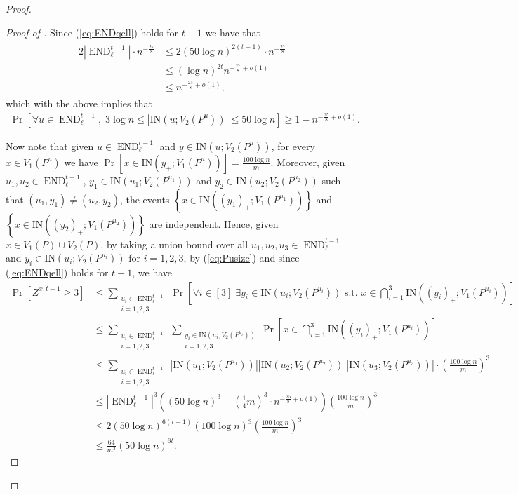 \documentclass{article}
\DeclareMathOperator{\END}{END}
\newcommand{\IN}[2]{\text{IN}\left(#1; #2 \right)}
\begin{document}
\begin{proof}
\begin{proof}[Proof of ]
		Since (\ref{eq:ENDqell}) holds for $t-1$ we have that
		\begin{align}
		\begin{split}
		\label{eq:p13}
		2\left|\END_{\ell}^{t-1} \right|\cdot n^{-\frac{27}{8}} &\le 2\left(50\log n \right)^{2(t-1)}\cdot n^{-\frac{27}{8}} \\
		&\le \left(\log n \right)^{2t} n^{-\frac{27}{8} + o(1)} \\
		&\le n^{-\frac{25}{8} + o(1)},
		\end{split}
		\end{align}
		which with the above implies that
		\begin{align}
		\label{eq:Pusize}
		\Pr\left[\forall u \in \END_{\ell}^{t-1},\; 3\log n \le \left|\IN{u}{V_2(P^u)} \right| \le 50\log n \right] \ge 1 - n^{-\frac{25}{8}+o(1)}.
		\end{align}
		
		Now note that given $u \in \END_{\ell}^{t-1}$ and $y \in \IN{u}{V_2(P^u)}$, for every $x \in V_1(P^u)$ we have $\Pr\left[x \in \IN{y_+}{V_1(P^u)} \right] = \frac{100\log n}{m}$.
		Moreover, given $u_1, u_2 \in \END_{\ell}^{t-1}$, $y_1 \in \IN{u_1}{V_2(P^{u_1})}$ and $y_2 \in \IN{u_2}{V_2(P^{u_2})}$ such that $(u_1, y_1) \neq (u_2,y_2)$, the events $\left\{x \in \IN{(y_1)_+}{V_1(P^{u_1})} \right\}$ and $\left\{x \in \IN{(y_2)_+}{V_1(P^{u_2})} \right\}$ are independent.
		Hence, given $x \in V_1(P) \cup V_2(P)$, by taking a union bound over all $u_1, u_2, u_3 \in \END_{\ell}^{t-1}$ and $y_i \in \IN{u_i}{V_2(P^{u_i})}$ for $i=1,2,3$, by (\ref{eq:Pusize}) and since (\ref{eq:ENDqell}) holds for $t-1$, we have
		\begin{align*}
		\Pr \left[Z^{x,t-1} \ge 3 \right] &\le \sum_{\substack{u_i \in \END_{\ell}^{t-1} \\ i=1,2,3}} \Pr\left[\forall i\in[3]\; \exists y_i \in \IN{u_i}{V_2(P^{u_i})} \text{ s.t. } x \in \bigcap_{i=1}^3 \IN{(y_i)_+}{V_1(P^{u_i})} \right] \\
		&\le \sum_{\substack{u_i \in \END_{\ell}^{t-1} \\ i=1,2,3}} \sum_{\substack{y_i \in \IN{u_i}{V_2(P^{u_i})} \\i=1,2,3}} \Pr\left[x \in \bigcap_{i=1}^3 \IN{(y_i)_+}{V_1(P^{u_i})} \right] \\
		&\le \sum_{\substack{u_i \in \END_{\ell}^{t-1} \\ i=1,2,3}} \left|\IN{u_1}{V_2(P^{u_1})} \right| \left|\IN{u_2}{V_2(P^{u_2})} \right| \left|\IN{u_3}{V_2(P^{u_3})} \right| \cdot \left(\tfrac{100\log n}{m} \right)^3 \\
		&\le \left|\END_{\ell}^{t-1} \right|^3 \left(\left(50\log n \right)^3 +  \left(\tfrac{1}{4}m \right)^3 \cdot n^{-\frac{25}{8}+o(1)} \right) \left(\tfrac{100\log n}{m} \right)^3 \\
		&\le 2\left(50\log n \right)^{6(t-1)} \left(100\log n \right)^3 \left(\tfrac{100\log n}{m} \right)^3 \\
		&\le \tfrac{64}{m^3}\left(50\log n \right)^{6t}.
		\end{align*}
		

\end{proof}
\end{proof}
\end{document}
